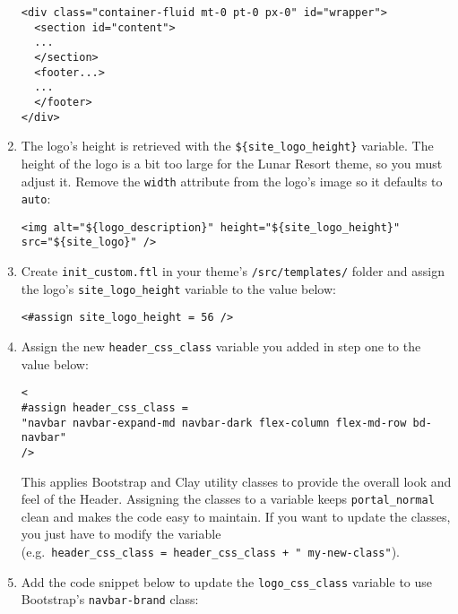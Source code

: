 \begin{enumerate}
\begin{verbatim}
<div class="container-fluid mt-0 pt-0 px-0" id="wrapper">
  <section id="content">
  ...
  </section>
  <footer...>
  ...
  </footer>
</div>
\end{verbatim}
\item
  The logo's height is retrieved with the
  \texttt{\$\{site\_logo\_height\}} variable. The height of the logo is
  a bit too large for the Lunar Resort theme, so you must adjust it.
  Remove the \texttt{width} attribute from the logo's image so it
  defaults to \texttt{auto}:

\begin{verbatim}
<img alt="${logo_description}" height="${site_logo_height}" src="${site_logo}" />
\end{verbatim}
\item
  Create \texttt{init\_custom.ftl} in your theme's
  \texttt{/src/templates/} folder and assign the logo's
  \texttt{site\_logo\_height} variable to the value below:

\begin{verbatim}
<#assign site_logo_height = 56 />
\end{verbatim}
\item
  Assign the new \texttt{header\_css\_class} variable you added in step
  one to the value below:

\begin{verbatim}
<
#assign header_css_class = 
"navbar navbar-expand-md navbar-dark flex-column flex-md-row bd-navbar" 
/>
\end{verbatim}

  This applies Bootstrap and Clay utility classes to provide the overall
  look and feel of the Header. Assigning the classes to a variable keeps
  \texttt{portal\_normal} clean and makes the code easy to maintain. If
  you want to update the classes, you just have to modify the variable
  (e.g.~\texttt{header\_css\_class\ =\ header\_css\_class\ +\ "\ my-new-class"}).
\item
  Add the code snippet below to update the \texttt{logo\_css\_class}
  variable to use Bootstrap's \texttt{navbar-brand} class:


\end{enumerate}
